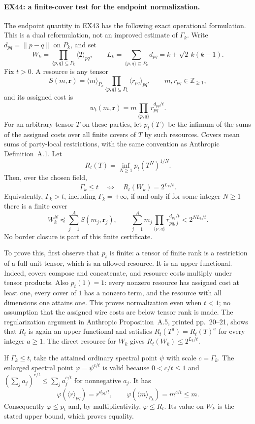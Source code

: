 \paragraph{EX44: a finite-cover test for the endpoint normalization.}
The endpoint quantity in EX43 has the following exact operational
formulation. This is a dual reformulation, not an improved estimate of
$\Gamma_k$. Write $d_{pq}=\|p-q\|$ on $P_k$, and set
\[
 W_k=\prod_{\{p,q\}\subseteq P_k}\langle2\rangle_{pq},
 \qquad L_k=\sum_{\{p,q\}\subseteq P_k}d_{pq}
          =k+\sqrt2\,k(k-1).
 \tag{EX44.1}
\]
Fix $t>0$. A resource is any tensor
\[
 S(m,\mathbf r)=\langle m\rangle_{P_k}
                  \prod_{\{p,q\}\subseteq P_k}\langle r_{pq}\rangle_{pq},
 \qquad m,r_{pq}\in\mathbb Z_{\ge1},
\]
and its assigned cost is
\[
                     w_t(m,\mathbf r)
                 =m\prod_{\{p,q\}}r_{pq}^{d_{pq}/t}.
 \tag{EX44.2}
\]
For an arbitrary tensor $T$ on these parties, let $p_t(T)$ be the
infimum of the sums of the assigned costs over all finite covers of
$T$ by such resources. Covers mean sums of party-local restrictions,
with the same convention as Anthropic Definition~A.1. Let
\[
                       R_t(T)=\inf_{N\ge1}p_t(T^N)^{1/N}.
 \tag{EX44.3}
\]
Then, over the chosen field,
\[
 \boxed{\quad \Gamma_k\le t
       \quad\Longleftrightarrow\quad
       R_t(W_k)=2^{L_k/t}.\quad}
 \tag{EX44.4}
\]
Equivalently, $\Gamma_k>t$, including $\Gamma_k=+\infty$, if and
only if for some integer $N\ge1$ there is a finite cover
\[
 W_k^N\preceq\sum_{j=1}^A S(m_j,\mathbf r_j),
 \qquad
 \sum_{j=1}^A m_j\prod_{\{p,q\}}r_{pq,j}^{d_{pq}/t}
                           <2^{NL_k/t}.
 \tag{EX44.5}
\]
No border closure is part of this finite certificate.

To prove this, first observe that $p_t$ is finite: a tensor of finite
rank is a restriction of a full unit tensor, which is an allowed
resource. It is an upper functional. Indeed, covers compose and
concatenate, and resource costs multiply under tensor products.
Also $p_t(1)=1$: every nonzero resource has assigned cost at least one,
every cover of $1$ has a nonzero term, and the resource with all
dimensions one attains one. This proves normalization even when
$t<1$; no assumption that the assigned wire costs are below tensor
rank is made. The regularization argument in Anthropic
Proposition~A.5, printed pp.~20--21, shows that $R_t$ is again an
upper functional and satisfies $R_t(T^a)=R_t(T)^a$ for every
integer $a\ge1$. The direct resource for $W_k$ gives
$R_t(W_k)\le2^{L_k/t}$.

If $\Gamma_k\le t$, take the attained ordinary spectral point
$\psi$ with scale $c=\Gamma_k$. The enlarged spectral point
$\varphi=\psi^{c/t}$ is valid because $0<c/t\le1$ and
$(\sum_j a_j)^{c/t}\le\sum_j a_j^{c/t}$ for nonnegative $a_j$.
It has
\[
 \varphi(\langle r\rangle_{pq})=r^{d_{pq}/t},\qquad
 \varphi(\langle m\rangle_{P_k})=m^{c/t}\le m.
\]
Consequently $\varphi\le p_t$ and, by multiplicativity,
$\varphi\le R_t$. Its value on $W_k$ is the stated upper bound,
which proves equality.

